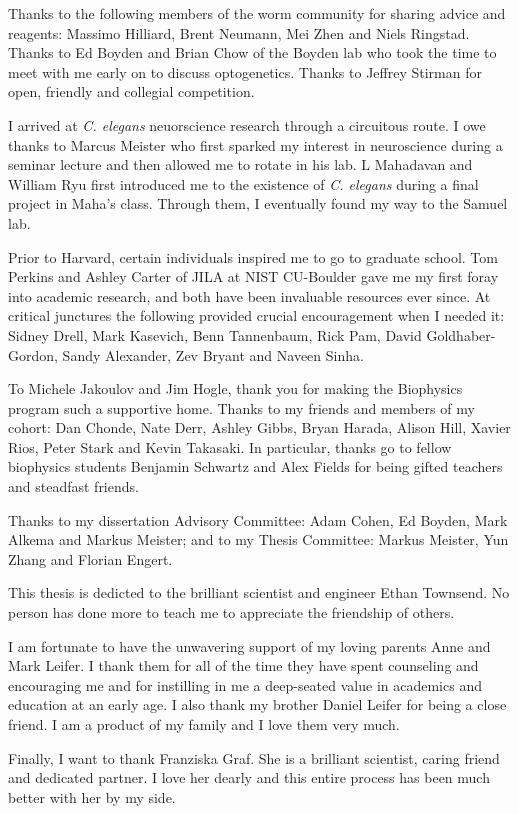 Thanks to the following members of the worm community for sharing advice and reagents: Massimo Hilliard,  Brent Neumann, Mei Zhen  and Niels Ringstad. Thanks to
Ed Boyden and Brian Chow of the Boyden lab who took the time to meet with me early on to discuss optogenetics. Thanks to Jeffrey Stirman for open, friendly and collegial competition. 
 
I arrived at \textit{C. elegans} neuorscience research through a circuitous route. I owe thanks to Marcus Meister who first sparked my interest in neuroscience during a seminar lecture and then allowed me to rotate in his lab. L Mahadavan and William Ryu first introduced me to the existence of \textit{C. elegans} during a final project in Maha's class. Through them, I eventually  found my way to the Samuel lab. 

Prior to Harvard, certain individuals inspired me to go to graduate school. Tom Perkins and Ashley Carter of JILA at NIST CU-Boulder gave me my first foray into  academic research, and both have been invaluable resources ever since. At critical junctures the following provided crucial encouragement when I needed it: Sidney Drell, Mark Kasevich, Benn Tannenbaum, Rick Pam, David Goldhaber-Gordon, Sandy Alexander, Zev Bryant and Naveen Sinha.

To Michele Jakoulov and Jim Hogle, thank you for making the Biophysics program such a supportive home. Thanks to my friends and members of my cohort: Dan Chonde, Nate Derr, Ashley Gibbs, Bryan Harada, Alison Hill, Xavier Rios, Peter Stark  and Kevin Takasaki. In particular, thanks go to fellow biophysics students Benjamin Schwartz and Alex Fields for being gifted teachers and steadfast friends.

Thanks to my dissertation Advisory Committee: Adam Cohen, Ed Boyden, Mark Alkema and Markus Meister; and to my Thesis Committee: Markus Meister, Yun Zhang and Florian Engert.

This thesis is dedicted to the brilliant scientist and engineer Ethan Townsend.
No person has done more to  teach me to appreciate the friendship of others.

I am fortunate to have the unwavering support of my loving parents Anne and Mark Leifer. I thank them for all of the time they have spent counseling and encouraging me and for instilling in me a deep-seated value in academics and education at an early age. I also thank my brother Daniel Leifer for being a close friend. I am a product of my family and I love them very much.

Finally, I want to thank Franziska Graf. She is a brilliant scientist, caring friend and dedicated partner. I love her dearly and this entire process has been much better with her by my side.



